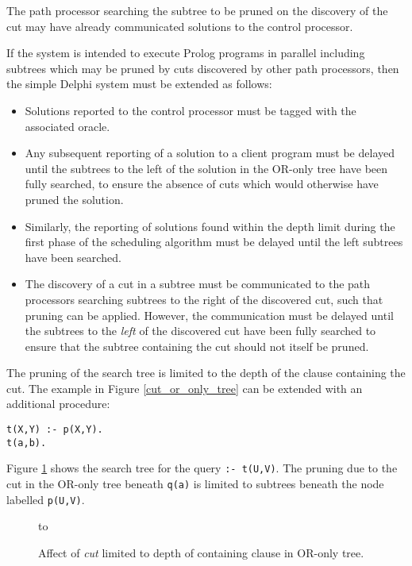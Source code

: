 The path processor searching the subtree to be pruned on the discovery of the
cut may have already communicated solutions to the control processor.

If the system is intended to execute Prolog programs in parallel including
subtrees which may be pruned by cuts discovered by other path processors, then
the simple Delphi system must be extended as follows:
\begin{itemize}
\item{Solutions reported to the control processor must be tagged with the
  associated oracle.}
\item{Any subsequent reporting of a solution to a client program must be delayed until the
  subtrees to the left of the solution in the OR-only tree have been fully
  searched, to ensure the absence of cuts which would otherwise have pruned the
  solution.}
\item{Similarly, the reporting of solutions found within the depth limit during the first phase
  of the scheduling algorithm must be delayed until the left subtrees have been searched.}
\item{The discovery of a cut in a subtree must be communicated to the path processors
  searching subtrees to the right of the discovered cut, such that pruning can be applied.
  However, the communication must be delayed until the subtrees to the \textit{left} of
  the discovered cut have been fully searched to ensure that the subtree containing the
  cut should not itself be pruned.}
\end{itemize}

The pruning of the search tree is limited to the depth of the clause containing the
cut.  The example in Figure \ref{cut_or_only_tree} can be extended with an additional
procedure:
\begin{verbatim}
t(X,Y) :- p(X,Y).
t(a,b).
\end{verbatim}
Figure \ref{cut_or_only_tree2} shows the search tree for the query \texttt{:- t(U,V)}.
The pruning due to the cut in
the OR-only tree beneath \texttt{q(a)} is limited to subtrees
beneath the node labelled \texttt{p(U,V)}.

\begin{figure}[htb]
\vspace{5mm} \hbox to 
\caption{Affect of \textit{cut} limited to depth of containing clause in OR-only tree.}
\vspace{5mm}
\label{cut_or_only_tree2}
\end{figure}

